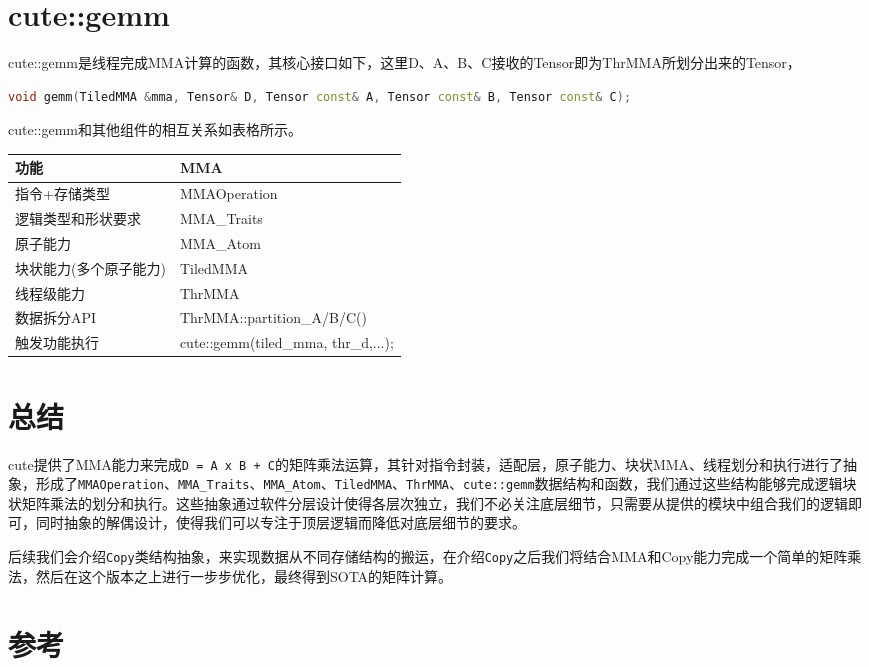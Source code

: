\section{cute::gemm}

cute::gemm是线程完成MMA计算的函数，其核心接口如下，这里D、A、B、C接收的Tensor即为ThrMMA所划分出来的Tensor，

\begin{lstlisting}[language=C++]
void gemm(TiledMMA &mma, Tensor& D, Tensor const& A, Tensor const& B, Tensor const& C);
\end{lstlisting}

cute::gemm和其他组件的相互关系如表格所示。

\begin{center}
\begin{tabular}{ll}
\toprule
功能 & MMA \\
\midrule
指令+存储类型 & MMAOperation \\
逻辑类型和形状要求 & MMA\_Traits \\
原子能力 & MMA\_Atom \\
块状能力(多个原子能力) & TiledMMA \\
线程级能力 & ThrMMA \\
数据拆分API & ThrMMA::partition\_A/B/C() \\
触发功能执行 & cute::gemm(tiled\_mma, thr\_d,...); \\
\bottomrule
\end{tabular}
\end{center}

\section{总结}

cute提供了MMA能力来完成\verb|D = A x B + C|的矩阵乘法运算，其针对指令封装，适配层，原子能力、块状MMA、线程划分和执行进行了抽象，形成了\verb|MMAOperation|、\verb|MMA_Traits|、\verb|MMA_Atom|、\verb|TiledMMA|、\verb|ThrMMA|、\verb|cute::gemm|数据结构和函数，我们通过这些结构能够完成逻辑块状矩阵乘法的划分和执行。这些抽象通过软件分层设计使得各层次独立，我们不必关注底层细节，只需要从提供的模块中组合我们的逻辑即可，同时抽象的解偶设计，使得我们可以专注于顶层逻辑而降低对底层细节的要求。

后续我们会介绍\verb|Copy|类结构抽象，来实现数据从不同存储结构的搬运，在介绍\verb|Copy|之后我们将结合MMA和Copy能力完成一个简单的矩阵乘法，然后在这个版本之上进行一步步优化，最终得到SOTA的矩阵计算。

\section{参考}

